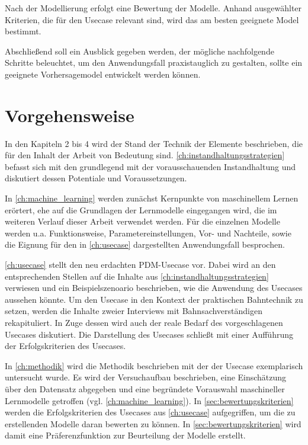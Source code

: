 Nach der Modellierung erfolgt eine Bewertung der Modelle. Anhand ausgewählter Kriterien, die für den Usecase relevant sind, wird das am besten geeignete Model bestimmt.

Abschließend soll ein Ausblick gegeben werden, der mögliche nachfolgende Schritte beleuchtet, um den Anwendungsfall praxistauglich zu gestalten, sollte ein geeignete Vorhersagemodel entwickelt werden können.

\section{Vorgehensweise}
\label{sec:vorgehensweise}
In den Kapiteln 2 bis 4 wird der Stand der Technik der Elemente beschrieben, die für den Inhalt der Arbeit von Bedeutung sind. \cref{ch:instandhaltungsstrategien} befasst sich mit den grundlegend mit der vorausschauenden Instandhaltung und diskutiert dessen Potentiale und Voraussetzungen.

In \cref{ch:machine_learning} werden zunächst Kernpunkte von maschinellem Lernen erörtert, ehe auf die Grundlagen der Lernmodelle eingegangen wird, die im weiteren Verlauf dieser Arbeit verwendet werden. Für die einzelnen Modelle werden u.a. Funktionsweise, Parametereinstellungen, Vor- und Nachteile, sowie die Eignung für den in \cref{ch:usecase} dargestellten Anwendungsfall besprochen. 

\cref{ch:usecase} stellt den neu erdachten PDM-Usecase vor. Dabei wird an den entsprechenden Stellen auf die Inhalte aus \cref{ch:instandhaltungsstrategien} verwiesen und ein Beispielszenoario beschrieben, wie die Anwendung des Usecases aussehen könnte. Um den Usecase in den Kontext der praktischen Bahntechnik zu setzen, werden die Inhalte zweier Interviews mit Bahnsachverständigen rekapituliert. In Zuge dessen wird auch der reale Bedarf des vorgeschlagenen Usecases diskutiert. Die Darstellung des Usecases schließt mit einer Aufführung der Erfolgskriterien des Usecases.

In \cref{ch:methodik} wird die Methodik beschrieben mit der der Usecase exemplarisch untersucht wurde. Es wird der Versuchaufbau beschrieben, eine Einschätzung über den Datensatz abgegeben und eine begründete Vorauswahl maschineller Lernmodelle getroffen (vgl. \cref{ch:machine_learning}). In \cref{sec:bewertungskriterien} werden die Erfolgskriterien des Usecases aus \cref{ch:usecase} aufgegriffen, um die zu erstellenden Modelle daran bewerten zu können. In \cref{sec:bewertungskriterien} wird damit eine Präferenzfunktion zur Beurteilung der Modelle erstellt.

